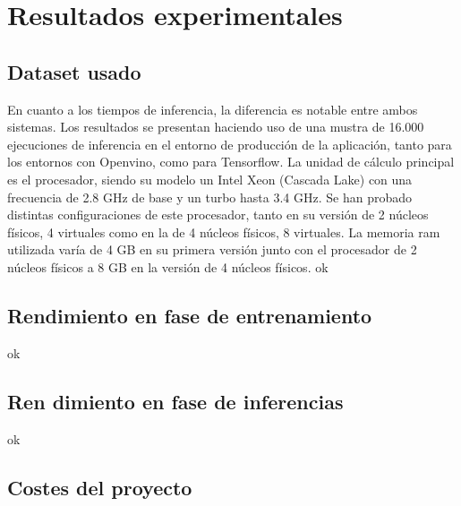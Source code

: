 \mbox{}

\chapter{Resultados experimentales}
\label{ch:chapte5}

\section{Dataset usado}
En cuanto a los tiempos de inferencia, la diferencia es notable entre ambos sistemas.
Los resultados se presentan haciendo uso de una mustra de 16.000 ejecuciones de inferencia en el entorno de producción de la aplicación, tanto para los entornos con Openvino, como para Tensorflow.
La unidad de cálculo principal es el procesador, siendo su modelo un Intel Xeon (Cascada Lake) con una frecuencia de 2.8 GHz de base y un turbo hasta 3.4 GHz.
Se han probado distintas configuraciones de este procesador, tanto en su versión de 2 núcleos físicos, 4 virtuales como en la de 4 núcleos físicos, 8 virtuales.
La memoria ram utilizada varía de 4 GB en su primera versión junto con el procesador de 2 núcleos físicos a 8 GB en la versión de 4 núcleos físicos.
ok
\section{Rendimiento en fase de entrenamiento}
ok
\section{Ren dimiento en fase de inferencias}
ok
\section{Costes del proyecto}